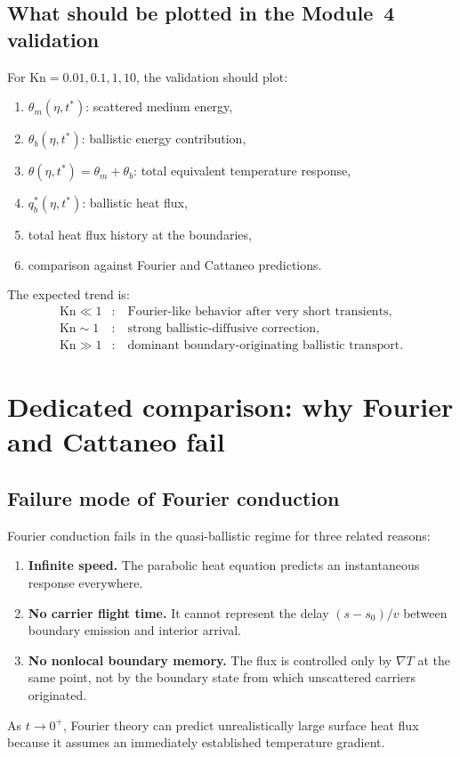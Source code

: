 \documentclass[11pt]{article}
\begin{document}
\subsection{What should be plotted in the Module~4 validation}
For \(\mathrm{Kn}=0.01,0.1,1,10\), the validation should plot:
\begin{enumerate}[leftmargin=1.6em]
    \item \(\theta_m(\eta,t^*)\): scattered medium energy,
    \item \(\theta_b(\eta,t^*)\): ballistic energy contribution,
    \item \(\theta(\eta,t^*)=\theta_m+\theta_b\): total equivalent temperature response,
    \item \(q_b^*(\eta,t^*)\): ballistic heat flux,
    \item total heat flux history at the boundaries,
    \item comparison against Fourier and Cattaneo predictions.
\end{enumerate}
The expected trend is:
\begin{align}
    \mathrm{Kn}\ll 1 &: \quad \text{Fourier-like behavior after very short transients,}\\
    \mathrm{Kn}\sim 1 &: \quad \text{strong ballistic-diffusive correction,}\\
    \mathrm{Kn}\gg 1 &: \quad \text{dominant boundary-originating ballistic transport.}
\end{align}

\section{Dedicated comparison: why Fourier and Cattaneo fail}
\subsection{Failure mode of Fourier conduction}
Fourier conduction fails in the quasi-ballistic regime for three related reasons:
\begin{enumerate}[leftmargin=1.6em]
    \item \textbf{Infinite speed.} The parabolic heat equation predicts an instantaneous response everywhere.
    \item \textbf{No carrier flight time.} It cannot represent the delay \((s-s_0)/v\) between boundary emission and interior arrival.
    \item \textbf{No nonlocal boundary memory.} The flux is controlled only by \(\nabla T\) at the same point, not by the boundary state from which unscattered carriers originated.
\end{enumerate}
As \(t\to 0^+\), Fourier theory can predict unrealistically large surface heat flux because it assumes an immediately established temperature gradient.
\end{document}
